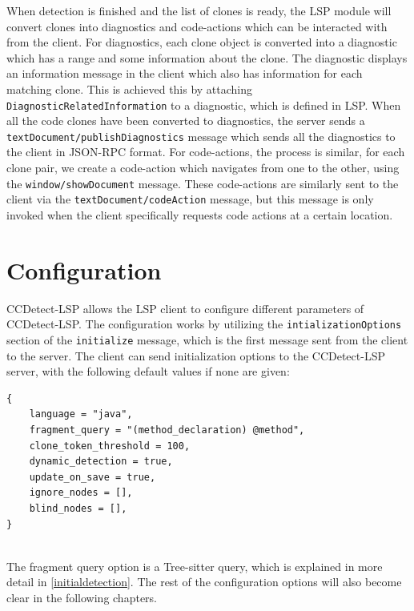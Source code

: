 When detection is finished and the list of clones is ready, the LSP module will convert
clones into diagnostics and code-actions which can be interacted with from the client. For
diagnostics, each clone object is converted into a diagnostic which has a range and some
information about the clone. The diagnostic displays an information message in the client
which also has information for each matching clone. This is achieved this by attaching
\verb|DiagnosticRelatedInformation| to a diagnostic, which is defined in LSP. When all the
code clones have been converted to diagnostics, the server sends a
\verb|textDocument/publishDiagnostics| message which sends all the diagnostics to the
client in JSON-RPC format. For code-actions, the process is similar, for each clone pair,
we create a code-action which navigates from one to the other, using the
\verb|window/showDocument| message. These code-actions are similarly sent to the client
via the \verb|textDocument/codeAction| message, but this message is only invoked when the
client specifically requests code actions at a certain location.

\section{Configuration}
\label{configuration}

CCDetect-LSP allows the LSP client to configure different parameters of CCDetect-LSP. The
configuration works by utilizing the \verb|intializationOptions| section of the
\verb|initialize| message, which is the first message sent from the client to the server.
The client can send initialization options to the CCDetect-LSP server, with the following
default values if none are given:

\begin{lstlisting}
{
    language = "java",
    fragment_query = "(method_declaration) @method",
    clone_token_threshold = 100,
    dynamic_detection = true,
    update_on_save = true,
    ignore_nodes = [],
    blind_nodes = [],
}


\end{lstlisting}

The fragment query option is a Tree-sitter query, which is explained in more detail in
\cref{initialdetection}. The rest of the configuration options will also become clear in
the following chapters.
